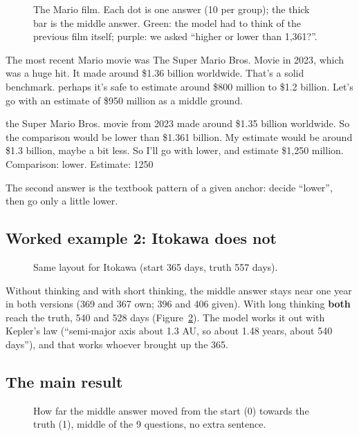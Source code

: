 \documentclass[11pt,a4paper]{article}
\begin{document}
\begin{figure}[ht]
\centering{}
\caption{The Mario film. Each dot is one answer (10 per group); the thick bar is the middle answer. Green: the model had to think of the previous film itself; purple: we asked \enquote{higher or lower than 1,361?}.}
\label{fig:mario}
\end{figure}

\begin{transcript}
\cut{} The most recent Mario movie was The Super Mario Bros. Movie in 2023, which was a huge hit. It made around \$1.36 billion worldwide. That's a solid benchmark. \cut{} perhaps it's safe to estimate around \$800 million to \$1.2 billion. \cut{} Let's go with an estimate of \$950 million as a middle ground.
\end{transcript}

\begin{transcript}
\cut{} the Super Mario Bros. movie from 2023 \cut{} made around \$1.35 billion worldwide. \cut{} So the comparison would be lower than \$1.361 billion. My estimate would be around \$1.3 billion, maybe a bit less. \cut{} So I'll go with lower, and estimate \$1,250 million.
 Comparison: lower. Estimate: 1250
\end{transcript}
The second answer is the textbook pattern of a given anchor: decide \enquote{lower}, then go only a little lower.

\subsection{Worked example 2: Itokawa does not}
\begin{figure}[ht]
\centering{}
\caption{Same layout for Itokawa (start 365 days, truth 557 days).}
\label{fig:itokawa}
\end{figure}
Without thinking and with short thinking, the middle answer stays near one year in both versions (369 and 367 own; 396 and 406 given). With long thinking \textbf{both} reach the truth, 540 and 528 days (Figure~\ref{fig:itokawa}). The model works it out with Kepler's law (\enquote{semi-major axis about 1.3 AU, so about 1.48 years, about 540 days}), and that works whoever brought up the 365.

\subsection{The main result}
\begin{figure}[ht]
\centering{}
\caption{How far the middle answer moved from the start (0) towards the truth (1), middle of the 9 questions, no extra sentence.}
\label{fig:main}
\end{figure}
\end{document}
